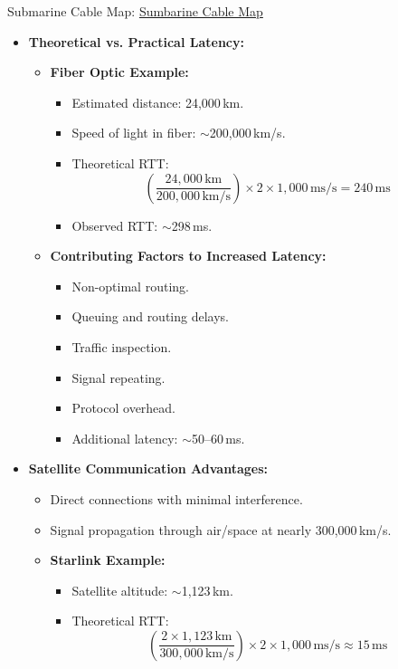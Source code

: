 \documentclass[../Main.tex]{subfiles}
\begin{document}
Submarine Cable Map: \href{https://www.submarinecablemap.com/submarine-cable/apollo}{Sumbarine Cable Map}

\begin{itemize}
    \item \textbf{Theoretical vs. Practical Latency:}
    \begin{itemize}
        \item \textbf{Fiber Optic Example:}
        \begin{itemize}
            \item Estimated distance: 24,000\,km.
            \item Speed of light in fiber: $\sim$200,000\,km/s.
            \item Theoretical RTT:
            \[
            \left(\frac{24,000\,\text{km}}{200,000\,\text{km/s}}\right) \times 2 \times 1,000\,\text{ms/s} = 240\,\text{ms}
            \]
            \item Observed RTT: $\sim$298\,ms.
        \end{itemize}
        \item \textbf{Contributing Factors to Increased Latency:}
        \begin{itemize}
            \item Non-optimal routing.
            \item Queuing and routing delays.
            \item Traffic inspection.
            \item Signal repeating.
            \item Protocol overhead.
            \item Additional latency: $\sim$50--60\,ms.
        \end{itemize}
    \end{itemize}
    \item \textbf{Satellite Communication Advantages:}
    \begin{itemize}
        \item Direct connections with minimal interference.
        \item Signal propagation through air/space at nearly 300,000\,km/s.
        \item \textbf{Starlink Example:}
        \begin{itemize}
            \item Satellite altitude: $\sim$1,123\,km.
            \item Theoretical RTT:
            \[
            \left(\frac{2 \times 1,123\,\text{km}}{300,000\,\text{km/s}}\right) \times 2 \times 1,000\,\text{ms/s} \approx 15\,\text{ms}
\]
\end{itemize}
\end{itemize}
\end{itemize}
\end{document}
